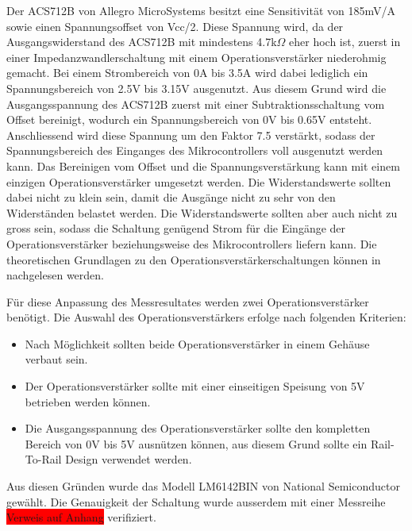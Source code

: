 Der ACS712B von Allegro MicroSystems besitzt eine Sensitivität von 185mV/A sowie einen Spannungsoffset von Vcc/2. Diese Spannung wird, da der Ausgangswiderstand des ACS712B mit mindestens 4.7k$\Omega$ eher hoch ist, zuerst in einer Impedanzwandlerschaltung mit einem Operationsverstärker niederohmig gemacht. Bei einem Strombereich von 0A bis 3.5A wird dabei lediglich ein Spannungsbereich von 2.5V bis 3.15V ausgenutzt. Aus diesem Grund wird die Ausgangsspannung des ACS712B zuerst mit einer Subtraktionsschaltung vom Offset bereinigt, wodurch ein Spannungsbereich von 0V bis 0.65V entsteht. Anschliessend wird diese Spannung um den Faktor 7.5 verstärkt, sodass der Spannungsbereich des Einganges des Mikrocontrollers voll ausgenutzt werden kann. Das Bereinigen vom Offset und die Spannungsverstärkung kann mit einem einzigen Operationsverstärker umgesetzt werden. Die Widerstandswerte sollten dabei nicht zu klein sein, damit die Ausgänge nicht zu sehr von den Widerständen belastet werden. Die Widerstandswerte sollten aber auch nicht zu gross sein, sodass die Schaltung genügend Strom für die Eingänge der Operationsverstärker beziehungsweise des Mikrocontrollers liefern kann.  Die theoretischen Grundlagen zu den Operationsverstärkerschaltungen können in \cite{operationsverstaerker} nachgelesen werden.

Für diese Anpassung des Messresultates werden zwei Operationsverstärker benötigt. Die Auswahl des Operationsverstärkers erfolge nach folgenden Kriterien:
\begin{itemize}
	\item Nach Möglichkeit sollten beide Operationsverstärker in einem Gehäuse verbaut sein.
	\item Der Operationsverstärker sollte mit einer einseitigen Speisung von 5V betrieben werden können.
	\item Die Ausgangsspannung des Operationsverstärker sollte den kompletten Bereich von 0V bis 5V ausnützen können, aus diesem Grund sollte ein Rail-To-Rail Design verwendet werden.
\end{itemize}
Aus diesen Gründen wurde das Modell LM6142BIN von National Semiconductor gewählt. Die Genauigkeit der Schaltung wurde ausserdem mit einer Messreihe \colorbox{red}{Verweis auf Anhang} verifiziert.